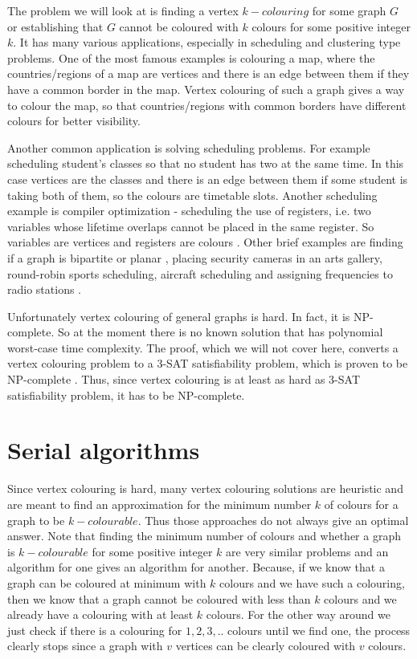 \documentclass{report}
\theoremstyle{plain}
\theoremstyle{definition}
\theoremstyle{remark}
\numberwithin{definition}{chapter}
\numberwithin{example}{chapter}
\numberwithin{figure}{chapter}
\numberwithin{theorem}{chapter}
\numberwithin{lemma}{chapter}
\begin{document}
The problem we will look at is finding a vertex $k-colouring$ for some graph $G$ or establishing that $G$ cannot be coloured with $k$ colours for some positive integer $k$. It has many various applications, especially in scheduling and clustering type problems. One of the most famous examples is colouring a map, where the countries/regions of a map are vertices and there is an edge between them if they have a common border in the map. Vertex colouring of such a graph gives a way to colour the map, so that countries/regions with common borders have different colours for better visibility.

Another common application is solving scheduling problems. For example scheduling student's classes so that no student has two at the same time. In this case vertices are the classes and there is an edge between them if some student is taking both of them, so the colours are timetable slots. Another scheduling example is compiler optimization - scheduling the use of registers, i.e. two variables whose lifetime overlaps cannot be placed in the same register. So variables are vertices and registers are colours \cite{skiena504algorithm}. Other brief examples are finding if a graph is bipartite or planar \cite{skiena504algorithm}, placing security cameras in an arts gallery, round-robin sports scheduling, aircraft scheduling and assigning frequencies to radio stations \cite{ahmed2012applications}.

Unfortunately vertex colouring of general graphs is hard. In fact, it is NP-complete. So at the moment there is no known solution that has polynomial worst-case time complexity. The proof, which we will not cover here, converts a vertex colouring problem to a 3-SAT satisfiability problem, which is proven to be NP-complete \cite{gibbons1985algorithmic}. Thus, since vertex colouring is at least as hard as 3-SAT satisfiability problem, it has to be NP-complete.

\section{Serial algorithms}

Since vertex colouring is hard, many vertex colouring solutions are heuristic and are meant to find an approximation for the minimum number $k$ of colours for a graph to be $k-colourable$. Thus those approaches do not always give an optimal answer. Note that finding the minimum number of colours and whether a graph is $k-colourable$ for some positive integer $k$ are very similar problems and an algorithm for one gives an algorithm for another. Because, if we know that a graph can be coloured at minimum with $k$ colours and we have such a colouring, then we know that a graph cannot be coloured with less than $k$ colours and we already have a colouring with at least $k$ colours. For the other way around we just check if there is a colouring for $1,2,3,..$ colours until we find one, the process clearly stops since a graph with $v$ vertices can be clearly coloured with $v$ colours.
\end{document}
